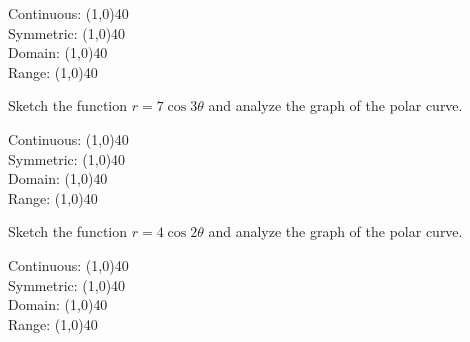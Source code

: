 \documentclass[addpoints]{exam}
\begin{document}
\begin{questions}
    Continuous: \line(1,0){40} \\
    \newline
    Symmetric: \line(1,0){40} \\
    \newline
    Domain: \line(1,0){40} \\
    \newline
    Range: \line(1,0){40} \\
    
    \question[1] Sketch the function $r = 7\cos3\theta$ and analyze the graph of the polar curve.
    
        \begin{left} 
        \end{left}
    
    Continuous: \line(1,0){40} \\
    \newline
    Symmetric: \line(1,0){40} \\
    \newline
    Domain: \line(1,0){40} \\
    \newline
    Range: \line(1,0){40} \\
    
    \newpage
    \question[1] Sketch the function $r = 4\cos2\theta$ and analyze the graph of the polar curve.
    
        \begin{left} 
        \end{left}
    
    Continuous: \line(1,0){40} \\
    \newline
    Symmetric: \line(1,0){40} \\
    \newline
    Domain: \line(1,0){40} \\
    \newline
    Range: \line(1,0){40} \\
    

\end{questions}
\end{document}
